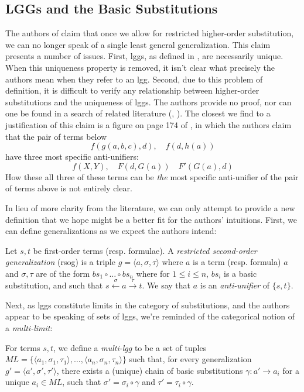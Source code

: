 \documentclass[12pt,a4paper]{article}
\begin{document}
\subsection{LGGs and the Basic Substitutions}
The authors of \cite{Schmidt-2014} claim that once we allow for restricted
higher-order substitution, we can no longer speak of a single least general
generalization. This claim presents a number of issues. First, lggs, as
defined in \cite{Plotkin70}, are necessarily unique. When this uniqueness
property is removed, it isn't clear what precisely the authors mean when they
refer to an lgg. Second, due to this problem of definition, it is difficult
to verify any relationship between higher-order substitutions and the
uniqueness of lggs. The authors provide no proof, nor can one be found in a
search of related literature (\cite{Krumnack2007RestrictedHA},
\cite{Schwering2009SyntacticPO}). The closest we find to a justification of
this claim is a figure on page 174 of \cite{Schmidt-2014}, in which the
authors claim that the pair of terms below $$f (g(a, b, c), d),\quad f (d, h (a))$$
have three most specific anti-unifiers: $$f (X, Y ), \quad F (d,G(a)) \quad F'(G(a), d)$$
How these all three of these terms can be \textit{the} most specific anti-unifier of the pair of terms above is not entirely clear.

In lieu of more clarity from the literature, we can only attempt to provide a
new definition that we hope might be a better fit for the authors'
intuitions. First, we can define generalizations as we expect the authors
intend:

\begin{definition}
    Let $s, t$ be first-order terms (resp. formulae). A \textit{restricted second-order generalization} (rsog) is a triple $g = \langle a, \sigma, \tau \rangle$ where $a$ is a term (resp. formula) $a$ and $\sigma, \tau$ are of the form $bs_1 \circ \dots \circ bs_n$ where for $1 \le i \le n$, $bs_i$ is a basic substitution, and such that $s \xleftarrow{\sigma} a \xrightarrow{\tau} t$.
    We say that $a$ is an \textit{anti-unifier} of $\{s,t\}$.
\end{definition}
Next, as lggs constitute limits in the category of substitutions, and the authors appear to be speaking of sets of lggs, we're reminded of the categorical notion of a \textit{multi-limit}:

\begin{definition}
    For terms $s,t$, we define a \textit{multi-lgg} to be a set of tuples $ML = \{ \langle a_1, \sigma_1, \tau_1 \rangle, \dots, \langle a_n, \sigma_n, \tau_n \rangle\}$ such that, for every generalization $g' = \langle a', \sigma', \tau' \rangle$, there exists a (unique) chain of basic substitutions $\gamma : a' \to a_i$ for a unique $a_i \in ML$, such that $\sigma' = \sigma_i \circ \gamma$ and $\tau' = \tau_i \circ \gamma$.
\end{definition}
\end{document}
